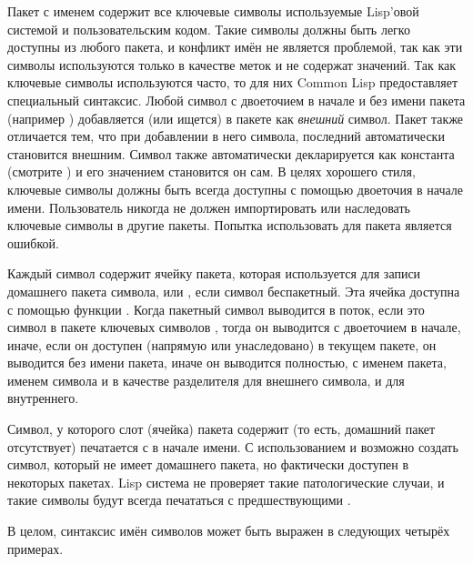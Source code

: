 Пакет с именем  содержит все ключевые символы
используемые Lisp'овой системой и пользовательским кодом. Такие
символы должны быть легко доступны из любого пакета, и конфликт имён
не является проблемой, так как эти символы используются только в
качестве меток и не содержат значений. Так как ключевые символы
используются часто, то для них Common Lisp предоставляет специальный
синтаксис. Любой символ с двоеточием в начале и без имени пакета
(например ) добавляется (или ищется) в пакете 
как \emph{внешний} символ. Пакет  также отличается тем,
что при добавлении в него символа, последний автоматически становится
внешним. Символ также автоматически декларируется как константа
(смотрите ) и его значением становится он сам.  В
целях хорошего стиля, ключевые символы должны быть всегда доступны с
помощью двоеточия в начале имени. Пользователь никогда не должен
импортировать или наследовать ключевые символы в другие
пакеты. Попытка использовать  для пакета
 является ошибкой.

Каждый символ содержит ячейку пакета, которая используется для записи
домашнего пакета символа, или {\false}, если символ беспакетный. Эта
ячейка доступна с помощью функции .  Когда
пакетный символ выводится в поток, если это символ в пакете ключевых
символов , тогда он выводится с двоеточием в начале,
иначе, если он доступен (напрямую или унаследовано) в текущем пакете,
он выводится без имени пакета, иначе он выводится полностью, с
именем пакета, именем символа и \cd{:} в качестве разделителя для
внешнего символа, и \cd{::} для внутреннего.

Символ, у которого слот (ячейка) пакета содержит {\false} (то есть, домашний
пакет отсутствует) печатается с \cd{\#:} в начале имени. С использованием
 и  возможно создать символ, который не имеет
домашнего пакета, но фактически доступен в некоторых пакетах.
Lisp система не проверяет такие патологические случаи, и такие символы будут
всегда печататься с предшествующими \cd{\#:}.

В целом, синтаксис имён символов может быть выражен в следующих четырёх примерах.

